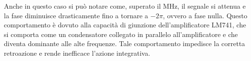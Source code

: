 \documentclass[a4paper,12pt]{article}
\begin{document}
Anche in questo caso si può notare come, superato il \si{\mega\hertz}, il segnale si attenua e la fase diminuisce drasticamente fino a tornare a \(-2\pi\), ovvero a fase nulla. Questo comportamento è dovuto alla capacità di giunzione dell’amplificatore LM741, che si comporta come un condensatore collegato in parallelo all’amplificatore e che diventa dominante alle alte frequenze. Tale comportamento impedisce la corretta retroazione e rende inefficace l’azione integrativa. 
\end{document}
